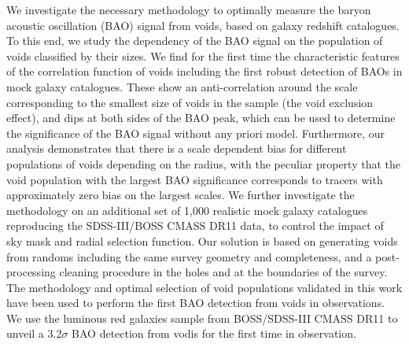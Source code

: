 \begin{eabstract}
  We investigate the necessary methodology to optimally measure the baryon acoustic oscillation (BAO) signal from voids, based on galaxy redshift catalogues. 
  To this end, we study the dependency of the BAO signal on the population of voids classified by their sizes. 
  We find for the first time the characteristic features of the correlation function of voids including the first robust detection of BAOs in mock galaxy catalogues. These show an anti-correlation around the scale corresponding to the smallest size of voids in the sample (the void exclusion effect), and  dips at both sides of the BAO peak, which can be used to determine the significance of the BAO signal without any priori model.
  Furthermore, our analysis demonstrates that there is a scale dependent bias for different populations of voids depending on the radius, with the peculiar property that the void population with the largest BAO significance corresponds to tracers with approximately zero bias on the largest scales.
  We further investigate the methodology on an additional set of 1,000 realistic mock galaxy catalogues reproducing the SDSS-III/BOSS CMASS DR11 data, to control the impact of sky mask and radial selection function. Our solution is based on generating voids from randoms including the same survey geometry and completeness, and a post-processing cleaning procedure in the holes and at the boundaries of the survey.
  The methodology and optimal selection of void populations validated in this work have been used to perform the first BAO detection from voids in observations. We use the luminous red galaxies sample from BOSS/SDSS-III CMASS DR11 to unveil a 3.2$\sigma$ BAO detection from vodis for the first time in observation.
\end{eabstract}

